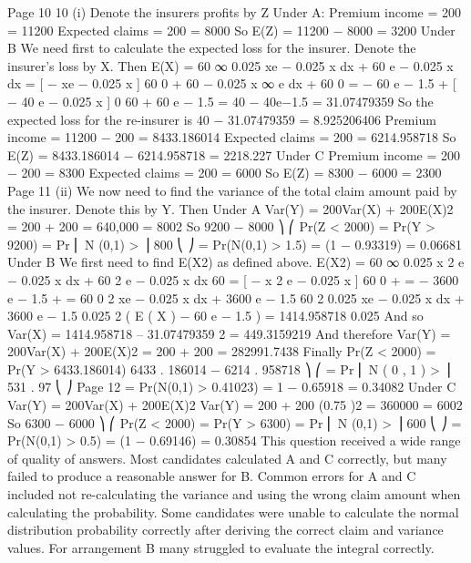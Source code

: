\documentclass[a4paper,12pt]{article}
\begin{document}
Page 10%
10
(i)
Denote the insurers profits by Z
Under A:
Premium income = 200   = 11200
Expected claims = 200  = 8000
So E(Z) = 11200 − 8000 = 3200
Under B
We need first to calculate the expected loss for the insurer. Denote the
insurer’s loss by X. Then
E(X) =
60
∞
0.025 xe − 0.025 x dx + 60 \times  {} e − 0.025 x dx
= [ − xe − 0.025 x ] 60
0 + 
60 − 0.025 x
∞
e
dx + 60 
0
= − 60 e − 1.5 + [ − 40 e − 0.025 x ] 0 60 + 60 e − 1.5
= 40 − 40e−1.5 = 31.07479359
So the expected loss for the re-insurer is 40 − 31.07479359 = 8.925206406
Premium income = 11200 − 200   = 8433.186014
Expected claims = 200  = 6214.958718
So E(Z) = 8433.186014 − 6214.958718 = 2218.227
Under C
Premium income = 200   − 200    = 8300
Expected claims = 200   = 6000
So E(Z) = 8300 − 6000 = 2300
Page 11%
(ii)
We now need to find the variance of the total claim amount paid by the
insurer. Denote this by Y. Then
Under A
Var(Y) = 200Var(X) + 200E(X)2
= 200  + 200  = 640,000 = 8002
So
9200 − 8000 ⎞
⎛
Pr(Z < 2000) = Pr(Y > 9200) = Pr ⎜ N (0,1) >
⎟
800
⎝
⎠
= Pr(N(0,1) > 1.5) = (1 − 0.93319) = 0.06681
Under B
We first need to find E(X2) as defined above.
E(X2) =
60
∞
0.025 x 2 e − 0.025 x dx + 60 2  e − 0.025 x dx
60
= [ − x 2 e − 0.025 x ] 60
0 + \int 
= − 3600 e − 1.5 +
=
60
0
2 xe − 0.025 x dx + 3600 e − 1.5
60
2
0.025 xe − 0.025 x dx + 3600 e − 1.5
0.025
2
( E ( X ) − 60 e − 1.5 ) = 1414.958718
0.025
And so
Var(X) = 1414.958718 – 31.07479359 2 = 449.3159219
And therefore
Var(Y) = 200Var(X) + 200E(X)2
= 200  + 200  = 282991.7438
Finally
Pr(Z < 2000) = Pr(Y > 6433.186014)
6433 . 186014 − 6214 . 958718 ⎞
⎛
= Pr ⎜ N ( 0 , 1 ) >
⎟
531 . 97
⎝
⎠
Page 12%
= Pr(N(0,1) > 0.41023) = 1 − 0.65918 = 0.34082
Under C
Var(Y) = 200Var(X) + 200E(X)2
Var(Y) = 200   + 200 \times  (0.75 )2 = 360000 = 6002
So
6300 − 6000 ⎞
⎛
Pr(Z < 2000) = Pr(Y > 6300) = Pr ⎜ N (0,1) >
⎟
600
⎝
⎠
= Pr(N(0,1) > 0.5) = (1 − 0.69146) = 0.30854
This question received a wide range of quality of answers. Most candidates calculated
A and C correctly, but many failed to produce a reasonable answer for B. Common
errors for A and C included not re-calculating the variance and using the wrong
claim amount when calculating the probability. Some candidates were unable to
calculate the normal distribution probability correctly after deriving the correct claim
and variance values. For arrangement B many struggled to evaluate the integral
correctly.
\end{document}
